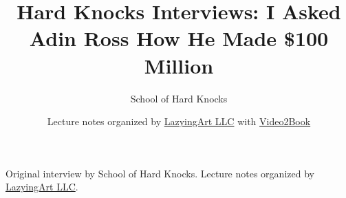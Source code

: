 \documentclass[11pt,oneside]{book}
\begin{document}
\frontmatter
\title{Hard Knocks Interviews: I Asked Adin Ross How He Made \$100 Million}
\author{School of Hard Knocks}
\date{Lecture notes organized by \href{https://lazying.art}{LazyingArt LLC} with \href{https://github.com/lachlanchen/Video2Book}{Video2Book}}
\maketitle
\begin{center}
\small Original interview by School of Hard Knocks. Lecture notes organized by \href{https://lazying.art}{LazyingArt LLC}.
\end{center}
\clearpage
\mainmatter

\end{document}
